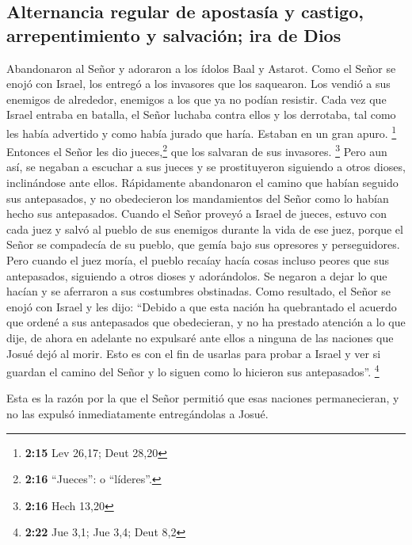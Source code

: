 \hypertarget{alternancia-regular-de-apostasuxeda-y-castigo-arrepentimiento-y-salvaciuxf3n-ira-de-dios}{%
\subsection{Alternancia regular de apostasía y castigo, arrepentimiento
y salvación; ira de
Dios}\label{alternancia-regular-de-apostasuxeda-y-castigo-arrepentimiento-y-salvaciuxf3n-ira-de-dios}}

 Abandonaron al Señor y adoraron a los ídolos Baal y
Astarot.  Como el Señor se enojó con Israel, los entregó
a los invasores que los saquearon. Los vendió a sus enemigos de
alrededor, enemigos a los que ya no podían resistir. 
Cada vez que Israel entraba en batalla, el Señor luchaba contra ellos y
los derrotaba, tal como les había advertido y como había jurado que
haría. Estaban en un gran apuro. \footnote{\textbf{2:15} Lev 26,17; Deut
  28,20}  Entonces el Señor les dio jueces,\footnote{\textbf{2:16}
  ``Jueces'': o ``líderes''.} que los salvaran de sus invasores.
\footnote{\textbf{2:16} Hech 13,20}  Pero aun así, se
negaban a escuchar a sus jueces y se prostituyeron siguiendo a otros
dioses, inclinándose ante ellos. Rápidamente abandonaron el camino que
habían seguido sus antepasados, y no obedecieron los mandamientos del
Señor como lo habían hecho sus antepasados.  Cuando el
Señor proveyó a Israel de jueces, estuvo con cada juez y salvó al pueblo
de sus enemigos durante la vida de ese juez, porque el Señor se
compadecía de su pueblo, que gemía bajo sus opresores y perseguidores.
 Pero cuando el juez moría, el pueblo recaíay hacía cosas
incluso peores que sus antepasados, siguiendo a otros dioses y
adorándolos. Se negaron a dejar lo que hacían y se aferraron a sus
costumbres obstinadas.  Como resultado, el Señor se enojó
con Israel y les dijo: ``Debido a que esta nación ha quebrantado el
acuerdo que ordené a sus antepasados que obedecieran, y no ha prestado
atención a lo que dije,  de ahora en adelante no
expulsaré ante ellos a ninguna de las naciones que Josué dejó al morir.
 Esto es con el fin de usarlas para probar a Israel y ver
si guardan el camino del Señor y lo siguen como lo hicieron sus
antepasados''. \footnote{\textbf{2:22} Jue 3,1; Jue 3,4; Deut 8,2}

 Esta es la razón por la que el Señor permitió que esas
naciones permanecieran, y no las expulsó inmediatamente entregándolas a
Josué.


